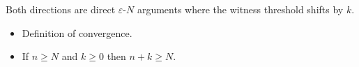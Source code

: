 \begin{remark*}
Both directions are direct $\varepsilon$-$N$ arguments where the witness
threshold shifts by $k$.
\end{remark*}

\begin{remark*}[Dependencies]
\begin{itemize}
  \item Definition of convergence.
  \item If $n \ge N$ and $k \ge 0$ then $n + k \ge N$.
\end{itemize}
\end{remark*}
